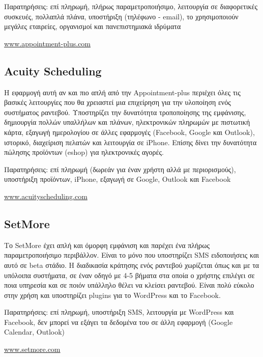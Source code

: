 Παρατηρήσεις: επί πληρωμή, πλήρως παραμετροποιήσιμο, λειτουργία σε διαφορετικές συσκευές, πολλαπλά πλάνα, υποστήριξη (τηλέφωνο - email), το χρησιμοποιούν μεγάλες εταιρείες, οργανισμοί και πανεπιστημιακά ιδρύματα

\href{http://www.appointment-plus.com/}{www.appointment-plus.com}

\subsection{Acuity Scheduling}
Η εφαρμογή αυτή αν και πιο απλή από την Appointment-plus περιέχει όλες τις βασικές λειτουργίες που θα χρειαστεί μια επιχείρηση για την υλοποίηση ενός συστήματος ραντεβού. Υποστηρίζει την δυνατότητα τροποποίησης της εμφάνισης, δημιουργία πολλών υπαλλήλων και πλάνων, ηλεκτρονικών πληρωμών με πιστωτική κάρτα, εξαγωγή ημερολογίου σε άλλες εφαρμογές (Facebook, Google και Outlook), ιστορικό, διαχείριση πελατών και λειτουργία σε iPhone. Επίσης δίνει την δυνατότητα πώλησης προϊόντων (eshop) για ηλεκτρονικές αγορές.

Παρατηρήσεις: επί πληρωμή (δωρεάν για έναν χρήστη αλλά με περιορισμούς), υποστήριξη προϊόντων, iPhone, εξαγωγή σε Google, Outlook και Facebook

\href{http://www.acuityscheduling.com/}{www.acuityscheduling.com}

\subsection{SetMore}
Το SetMore έχει απλή και όμορφη εμφάνιση και παρέχει ένα πλήρως παραμετροποιήσιμο περιβάλλον. Είναι το μόνο που υποστηρίζει SMS ειδοποιήσεις και αυτό σε beta στάδιο. Η διαδικασία κράτησης ενός ραντεβού χωρίζεται όπως και με τα υπόλοιπα συστήματα, σε έναν οδηγό με 4-5 βήματα στα οποία ο χρήστης επιλέγει σε ποια υπηρεσία και σε ποιόν υπάλληλο θέλει να κλείσει ραντεβού. Είναι πολύ εύκολο στην χρήση και υποστηρίζει plugins για το WordPress και το Facebook.

Παρατηρήσεις: επί πληρωμή, υποστήριξη SMS, λειτουργία με WordPress και Facebook, δεν μπορεί να εξάγει τα δεδομένα του σε άλλη εφαρμογή (Google Calendar, Outlook)

\href{http://www.setmore.com/}{www.setmore.com}

